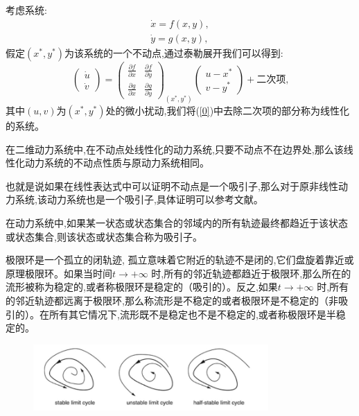 考虑系统:
\begin{equation}
    \begin{aligned}
        \dot{x}=f(x,y), \\
        \dot{y}=g(x,y),
    \end{aligned}
\end{equation}
假定$(x^*,y^*)$为该系统的一个不动点,通过泰勒展开我们可以得到:
\begin{equation}\label{0}
    \begin{pmatrix}
        \dot{u} \\
        \dot{v}
    \end{pmatrix}=
    \begin{pmatrix}
        \frac{\partial f}{\partial x} & \frac{\partial f}{\partial y} \\
        \frac{\partial g}{\partial x} & \frac{\partial g}{\partial y}
    \end{pmatrix}_{(x^*,y^*)}\begin{pmatrix}
        u-x^* \\ v-y^*
    \end{pmatrix}+\text{二次项,}
\end{equation}
其中$(u,v)$为$(x^*,y^*)$处的微小扰动,我们将(\ref{0})中去除二次项的部分称为线性化的系统。
\begin{prop}
    在二维动力系统中,在不动点处线性化的动力系统,只要不动点不在边界处,那么该线性化动力系统的不动点性质与原动力系统相同。
\end{prop}

也就是说如果在线性表达式中可以证明不动点是一个吸引子,那么对于原非线性动力系统,该动力系统也是一个吸引子,具体证明可以参考文献\cite{andronov1974qualitative}。
\begin{defn}[吸引子]
    在动力系统中,如果某一状态或状态集合的邻域内的所有轨迹最终都趋近于该状态或状态集合,则该状态或状态集合称为吸引子。
\end{defn}

\begin{defn}[极限环]
    极限环是一个孤立的闭轨迹, 孤立意味着它附近的轨迹不是闭的,它们盘旋着靠近或原理极限环。如果当时间$t\to +\infty$ 时,所有的邻近轨迹都趋近于极限环,那么所在的流形被称为稳定的,或者称极限环是稳定的（吸引的）。反之,如果$t\to +\infty$ 时,所有的邻近轨迹都远离于极限环,那么称流形是不稳定的或者极限环是不稳定的（非吸引的）。在所有其它情况下,流形既不是稳定也不是不稳定的,或者称极限环是半稳定的。
\end{defn}
\begin{figure}[H]
    \centering
    \includegraphics[width=0.8\textwidth]{Img/limit_cycle.png}
    \label{fig:limit_cycle}
\end{figure}

